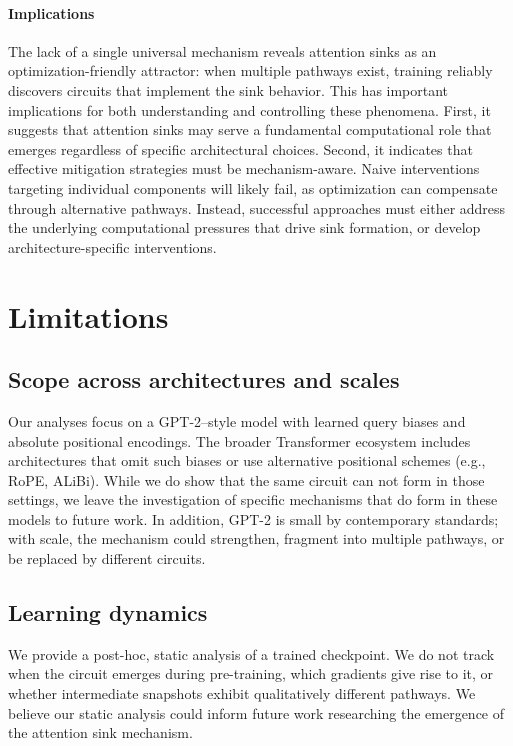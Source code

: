 \documentclass[11pt]{article}
\begin{document}
\paragraph{Implications}
The lack of a single universal mechanism reveals attention sinks as an optimization-friendly attractor: when multiple pathways exist, training reliably discovers circuits that implement the sink behavior. This has important implications for both understanding and controlling these phenomena. First, it suggests that attention sinks may serve a fundamental computational role that emerges regardless of specific architectural choices. Second, it indicates that effective mitigation strategies must be mechanism-aware. Naive interventions targeting individual components will likely fail, as optimization can compensate through alternative pathways. Instead, successful approaches must either address the underlying computational pressures that drive sink formation, or develop architecture-specific interventions. 



\section{Limitations}

\subsection{Scope across architectures and scales}
Our analyses focus on a GPT-2–style model with learned query biases and absolute positional encodings. The broader Transformer ecosystem includes architectures that omit such biases or use alternative positional schemes (e.g., RoPE, ALiBi). While we do show that the same circuit can not form in those settings, we leave the investigation of specific mechanisms that do form in these models to future work. In addition, GPT-2 is small by contemporary standards; with scale, the mechanism could strengthen, fragment into multiple pathways, or be replaced by different circuits.

\subsection{Learning dynamics}
We provide a post-hoc, static analysis of a trained checkpoint. We do not track when the circuit emerges during pre-training, which gradients give rise to it, or whether intermediate snapshots exhibit qualitatively different pathways. We believe our static analysis could inform future work researching the emergence of the attention sink mechanism.
\end{document}
